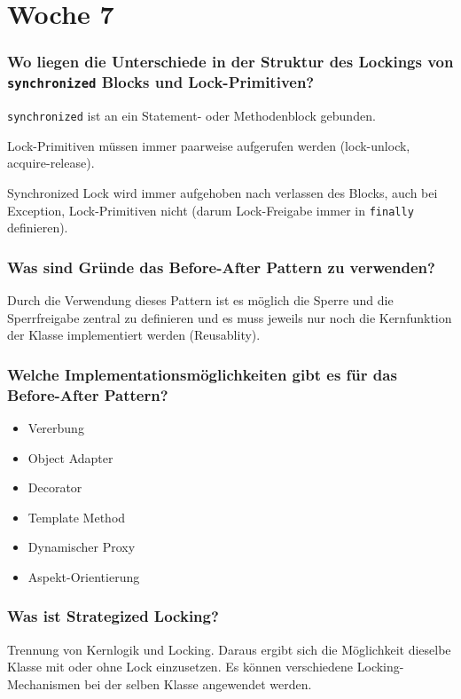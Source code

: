 \documentclass[10pt,a4paper]{scrartcl}
\begin{document}
\section{Woche 7}

\subsubsection{Wo liegen die Unterschiede in der Struktur des Lockings von \texttt{synchronized}
Blocks und Lock-Primitiven?}

\texttt{synchronized} ist an ein Statement- oder Methodenblock gebunden.

Lock-Primitiven müssen immer paarweise aufgerufen werden (lock-unlock, acquire-release).

Synchronized Lock wird immer aufgehoben nach verlassen des Blocks, auch bei Exception,
Lock-Primitiven nicht (darum Lock-Freigabe immer in \texttt{finally} definieren).
  
\subsubsection{Was sind Gründe das Before-After Pattern zu verwenden?}

Durch die Verwendung dieses Pattern ist es möglich die Sperre und die Sperrfreigabe zentral zu
definieren und es muss jeweils nur noch die Kernfunktion der Klasse implementiert werden (Reusablity).
  
\subsubsection{Welche Implementationsmöglichkeiten gibt es für das Before-After Pattern?}

\begin{itemize}
	\item Vererbung
	\item Object Adapter
	\item Decorator
	\item Template Method
	\item Dynamischer Proxy
	\item Aspekt-Orientierung
\end{itemize}
  
\subsubsection{Was ist Strategized Locking?}

Trennung von Kernlogik und Locking. Daraus ergibt sich die Möglichkeit dieselbe Klasse mit oder
ohne Lock einzusetzen. Es können verschiedene Locking-Mechanismen bei der selben Klasse angewendet
werden.
  
\end{document}
